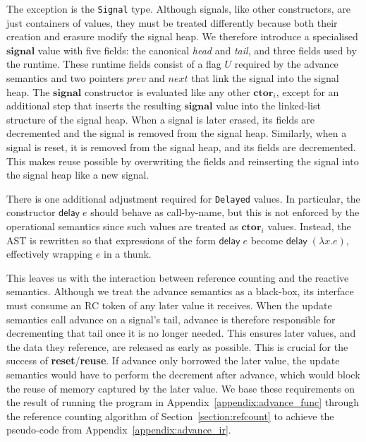 The exception is the \texttt{Signal} type. Although signals, like other constructors, are just containers of values, they must be treated differently because both their creation and erasure modify the signal heap.
We therefore introduce a specialised $\mathbf{signal}$ value with five fields: the canonical \textit{head} and \textit{tail}, and three fields used by the runtime. These runtime fields consist of a flag $U$ required by the advance semantics and two pointers $prev$ and $next$ that link the signal into the signal heap.
The $\mathbf{signal}$ constructor is evaluated like any other $\mathbf{ctor}_i$, except for an additional step that inserts the resulting $\mathbf{signal}$ value into the linked-list structure of the signal heap.
When a signal is later erased, its fields are decremented and the signal is removed from the signal heap. Similarly, when a signal is reset, it is removed from the signal heap, and its fields are decremented. This makes reuse possible by overwriting the fields and reinserting the signal into the signal heap like a new signal.

There is one additional adjustment required for \texttt{Delayed} values. In particular, the constructor $\mathsf{delay} \; e$ should behave as call-by-name, but this is not enforced by the operational semantics since such values are treated as $\mathbf{ctor}_i$ values. Instead, the AST is rewritten so that expressions of the form $\mathsf{delay} \; e$ become $\mathsf{delay} \; (\lambda x.e)$, effectively wrapping $e$ in a thunk.

This leaves us with the interaction between reference counting and the reactive semantics.
Although we treat the advance semantics as a black-box, its interface must consume an RC token of any later value it receives. When the update semantics call advance on a signal's tail, advance is therefore responsible for decrementing that tail once it is no longer needed.
This ensures later values, and the data they reference, are released as early as possible. This is crucial for the success of \textbf{reset}/\textbf{reuse}. If advance only borrowed the later value, the update semantics would have to perform the decrement after advance, which would block the reuse of memory captured by the later value.
We base these requirements on the result of running the program in Appendix~\ref{appendix:advance_func} through the reference counting algorithm of Section~\ref{section:refcount} to achieve the pseudo-code from Appendix~\ref{appendix:advance_ir}.

